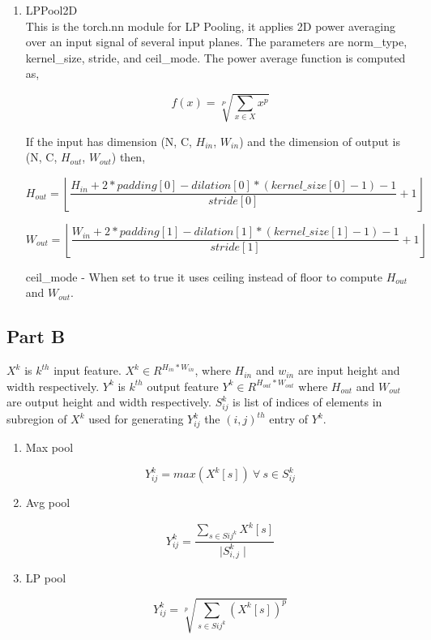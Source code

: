 \documentclass{article}
\begin{document}
\begin{enumerate}
    \item LPPool2D \\
    
    This is the torch.nn module for LP Pooling, it applies 2D power averaging over an input signal of several input planes. 
    The parameters are norm\_type, kernel\_size, stride, and ceil\_mode. 
    The power average function is computed as, 
    
    \[
    f(x) = \sqrt[P]{\sum_{x\in X}{x^p}}
    \]
    
    If the input has dimension (N, C, $H_{in}$, $W_{in}$) and the dimension of output is (N, C, $H_{out}$, $W_{out}$) then,  
    
    \[
    H_{out} = \left \lfloor{ 
    \frac{H_{in} + 2 * padding[0] - dilation[0] * (kernel\_size[0] -1) -1}{stride[0]}} + 1 \right \rfloor
    \]
    
    \[
    W_{out} = \left \lfloor{  
    \frac{W_{in} + 2 * padding[1] - dilation[1] * (kernel\_size[1] -1) -1}{stride[1]}} + 1 \right \rfloor 
    \]
    
    ceil\_mode - When set to true it uses ceiling instead of floor to compute $H_{out}$ and $W_{out}$.

\end{enumerate}

\subsection*{Part B}

$X^k$ is $k^{th}$ input feature.
$X^k \in R^{H_{in} * W_{in}}$, where $H_{in}$ and $w_{in}$ are input height and width respectively. 
$Y^k$ is $k^{th}$ output feature $Y^k \in R^{H_{out} * W_{out}}$ where $H_{out}$ and $W_{out}$ are output height and width respectively.
$S_{ij}^k$ is list of indices of elements in subregion of $X^k$ used for generating $Y_{ij}^k$ the $(i,j)^{th}$ entry of $Y^k$.

\begin{enumerate}
    \item Max pool 

    \[
    Y_{ij}^k = max(X^k[s]) \  \forall \  s \in S_{ij}^k
    \]

    \item Avg pool 

    \[
    Y_{ij}^k = \frac{\sum_{s \in S{ij}^k} X^k[s]}{\mid S_{i,j}^{k} \mid}
    \]

    \item LP pool 
    
    \[
    Y_{ij}^k = \sqrt[p]{\sum_{s \in S{ij}^k} (X^k[s])^p}
    \]

\end{enumerate}
\end{document}

